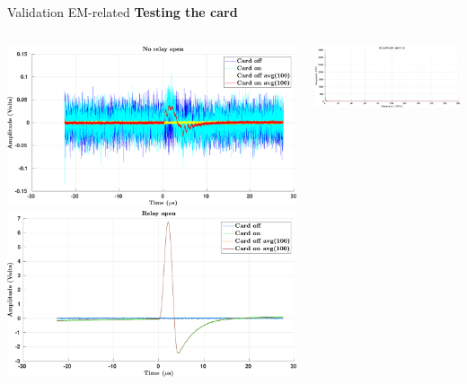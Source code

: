 \documentclass[utf8]{beamer} \usetheme{lfcr} %
\begin{document}
%
\begin{frame}{Validation}
  {EM-related}
  \textbf{Testing the card}

  \begin{columns}
    \begin{column}{0.5\textwidth}
      \includegraphics[width=\textwidth]{After_HFnoise_norelayopen.pdf}
      \includegraphics[width=\textwidth]{After_HFnoise_relayopen.pdf}
    \end{column}
    \begin{column}{0.5\textwidth}
      \includegraphics[width=\textwidth]{After_HFnoise_ampspec1.pdf}

\end{column}
\end{columns}
\end{frame}
\end{document}
